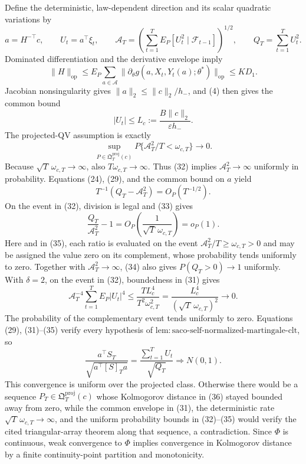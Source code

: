 Define the deterministic, law-dependent direction and its scalar quadratic variations by
\[
 a=H^{-\top}c,\qquad U_t=a^\top\xi_t,\qquad
 \mathcal A_T=\left(\sum_{t=1}^TE_P[U_t^2\mid\mathcal F_{t-1}]\right)^{1/2},\qquad
 Q_T=\sum_{t=1}^TU_t^2.
\tag{29}
\]
Dominated differentiation and the derivative envelope imply
\[
 \|H\|_{\mathrm{op}}
 \le E_P\sum_{a\in\mathcal A}
 \|\partial_\theta g(a,X_t,Y_t(a);\theta^*)\|_{\mathrm{op}}
 \le KD_1.
\tag{30}
\]
Jacobian nonsingularity gives \(\|a\|_2\le\|c\|_2/h_-\), and (4) then gives the common bound
\[
 |U_t|\le L_c:=\frac{B\|c\|_2}{\varepsilon h_-}.
\tag{31}
\]
The projected-QV assumption is exactly
\[
 \sup_{P\in\mathfrak Q_T^{\mathrm{proj}}(c)}
 P\{\mathcal A_T^2/T<\omega_{c,T}\}\longrightarrow0.
\tag{32}
\]
Because \(\sqrt T\,\omega_{c,T}\to\infty\), also \(T\omega_{c,T}\to\infty\). Thus (32) implies \(\mathcal A_T^2\to\infty\) uniformly in probability. Equations (24), (29), and the common bound on \(a\) yield
\[
 T^{-1}(Q_T-\mathcal A_T^2)=O_P(T^{-1/2}).
\tag{33}
\]
On the event in (32), division is legal and (33) gives
\[
 \frac{Q_T}{\mathcal A_T^2}-1
 =O_P\!\left(\frac{1}{\sqrt T\,\omega_{c,T}}\right)=o_P(1).
\tag{34}
\]
Here and in (35), each ratio is evaluated on the event \(\mathcal A_T^2/T\ge\omega_{c,T}>0\) and may be assigned the value zero on its complement, whose probability tends uniformly to zero. Together with \(\mathcal A_T^2\to\infty\), (34) also gives \(P(Q_T>0)\to1\) uniformly. With \(\delta=2\), on the event in (32), boundedness in (31) gives
\[
 \mathcal A_T^{-4}\sum_{t=1}^TE_P|U_t|^4
 \le\frac{TL_c^4}{T^2\omega_{c,T}^2}
 =\frac{L_c^4}{(\sqrt T\,\omega_{c,T})^2}\longrightarrow0.
\tag{35}
\]
The probability of the complementary event tends uniformly to zero. Equations (29), (31)--(35) verify every hypothesis of \(\mathrm{lem:saco\text{-}self\text{-}normalized\text{-}martingale\text{-}clt}\), so
\[
 \frac{a^\top S_T}{\sqrt{a^\top[S]_Ta}}
 =\frac{\sum_{t=1}^TU_t}{\sqrt{Q_T}}
 \Rightarrow N(0,1).
\tag{36}
\]
This convergence is uniform over the projected class. Otherwise there would be a sequence \(P_T\in\mathfrak Q_T^{\mathrm{proj}}(c)\) whose Kolmogorov distance in (36) stayed bounded away from zero, while the common envelope in (31), the deterministic rate \(\sqrt T\,\omega_{c,T}\to\infty\), and the uniform probability bounds in (32)--(35) would verify the cited triangular-array theorem along that sequence, a contradiction. Since \(\Phi\) is continuous, weak convergence to \(\Phi\) implies convergence in Kolmogorov distance by a finite continuity-point partition and monotonicity.

